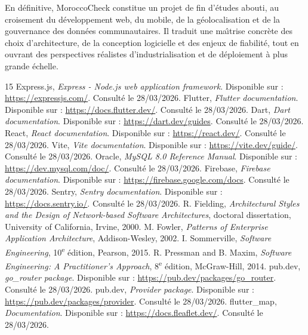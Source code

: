 ﻿\documentclass[12pt,a4paper]{report}
\begin{document}
En d\'efinitive, MoroccoCheck constitue un projet de fin d'\'etudes abouti, au croisement du d\'eveloppement web, du mobile, de la g\'eolocalisation et de la gouvernance des donn\'ees communautaires. Il traduit une ma\^\i trise concr\`ete des choix d'architecture, de la conception logicielle et des enjeux de fiabilit\'e, tout en ouvrant des perspectives r\'ealistes d'industrialisation et de d\'eploiement \`a plus grande \'echelle.

\begin{thebibliography}{15}
 Express.js, \emph{Express - Node.js web application framework}. Disponible sur : \url{https://expressjs.com/}. Consult\'e le 28/03/2026.
 Flutter, \emph{Flutter documentation}. Disponible sur : \url{https://docs.flutter.dev/}. Consult\'e le 28/03/2026.
 Dart, \emph{Dart documentation}. Disponible sur : \url{https://dart.dev/guides}. Consult\'e le 28/03/2026.
 React, \emph{React documentation}. Disponible sur : \url{https://react.dev/}. Consult\'e le 28/03/2026.
 Vite, \emph{Vite documentation}. Disponible sur : \url{https://vite.dev/guide/}. Consult\'e le 28/03/2026.
 Oracle, \emph{MySQL 8.0 Reference Manual}. Disponible sur : \url{https://dev.mysql.com/doc/}. Consult\'e le 28/03/2026.
 Firebase, \emph{Firebase documentation}. Disponible sur : \url{https://firebase.google.com/docs}. Consult\'e le 28/03/2026.
 Sentry, \emph{Sentry documentation}. Disponible sur : \url{https://docs.sentry.io/}. Consult\'e le 28/03/2026.
 R. Fielding, \emph{Architectural Styles and the Design of Network-based Software Architectures}, doctoral dissertation, University of California, Irvine, 2000.
 M. Fowler, \emph{Patterns of Enterprise Application Architecture}, Addison-Wesley, 2002.
 I. Sommerville, \emph{Software Engineering}, 10\textsuperscript{e} \'edition, Pearson, 2015.
 R. Pressman and B. Maxim, \emph{Software Engineering: A Practitioner's Approach}, 8\textsuperscript{e} \'edition, McGraw-Hill, 2014.
 pub.dev, \emph{go\_router package}. Disponible sur : \url{https://pub.dev/packages/go_router}. Consult\'e le 28/03/2026.
 pub.dev, \emph{Provider package}. Disponible sur : \url{https://pub.dev/packages/provider}. Consult\'e le 28/03/2026.
 flutter\_map, \emph{Documentation}. Disponible sur : \url{https://docs.fleaflet.dev/}. Consult\'e le 28/03/2026.
\end{thebibliography}
\end{document}
